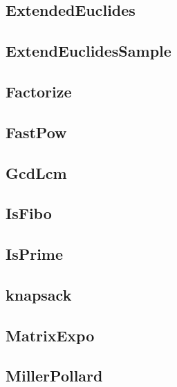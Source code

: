 \subsection{ ExtendedEuclides}
\raggedbottom
\hrulefill
\subsection{ ExtendEuclidesSample}
\raggedbottom
\hrulefill
\subsection{ Factorize}
\raggedbottom
\hrulefill
\subsection{ FastPow}
\raggedbottom
\hrulefill
\subsection{ GcdLcm}
\raggedbottom
\hrulefill
\subsection{ IsFibo}
\raggedbottom
\hrulefill
\subsection{ IsPrime}
\raggedbottom
\hrulefill
\subsection{ knapsack}
\raggedbottom
\hrulefill
\subsection{ MatrixExpo}
\raggedbottom
\hrulefill
\subsection{ MillerPollard}
\raggedbottom
\hrulefill
